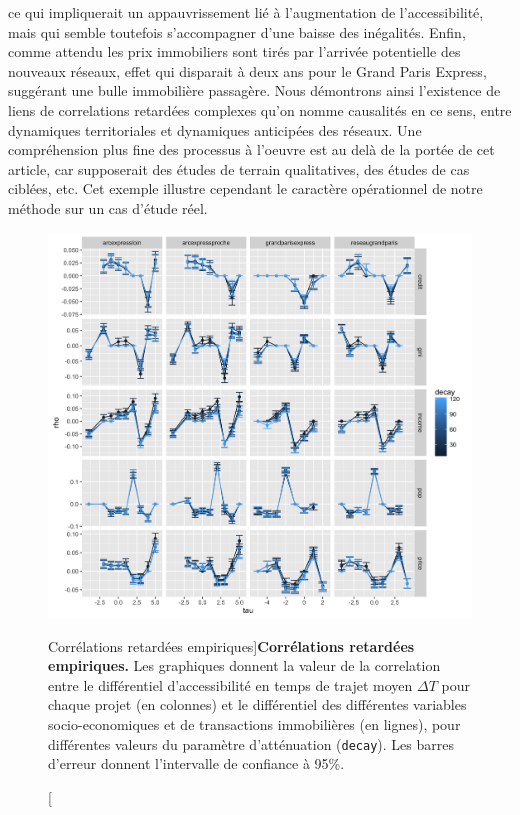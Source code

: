 ce qui impliquerait un appauvrissement lié à l'augmentation de l'accessibilité, mais qui semble toutefois s'accompagner d'une baisse des inégalités. Enfin, comme attendu les prix immobiliers sont tirés par l'arrivée potentielle des nouveaux réseaux, effet qui disparait à deux ans pour le Grand Paris Express, suggérant une bulle immobilière passagère. Nous démontrons ainsi l'existence de liens de correlations retardées complexes qu'on nomme causalités en ce sens, entre dynamiques territoriales et dynamiques anticipées des réseaux. Une compréhension plus fine des processus à l'oeuvre est au delà de la portée de cet article, car supposerait des études de terrain qualitatives, des études de cas ciblées, etc. Cet exemple illustre cependant le caractère opérationnel de notre méthode sur un cas d'étude réel.
 



\begin{figure}[h!]
\includegraphics[width=\linewidth]{Figures/GrandParisRealEstate/laggedcorrs_times_allvars}
\caption[][Corrélations retardées empiriques]{\label{fig:empiricalres}}{\textbf{Corrélations retardées empiriques.} Les graphiques donnent la valeur de la correlation entre le différentiel d'accessibilité en temps de trajet moyen $\Delta T$ pour chaque projet (en colonnes) et le différentiel des différentes variables socio-economiques et de transactions immobilières (en lignes), pour différentes valeurs du paramètre d'atténuation (\texttt{decay}). Les barres d'erreur donnent l'intervalle de confiance à 95\%.\label{fig:empiricalres}}
\end{figure}






